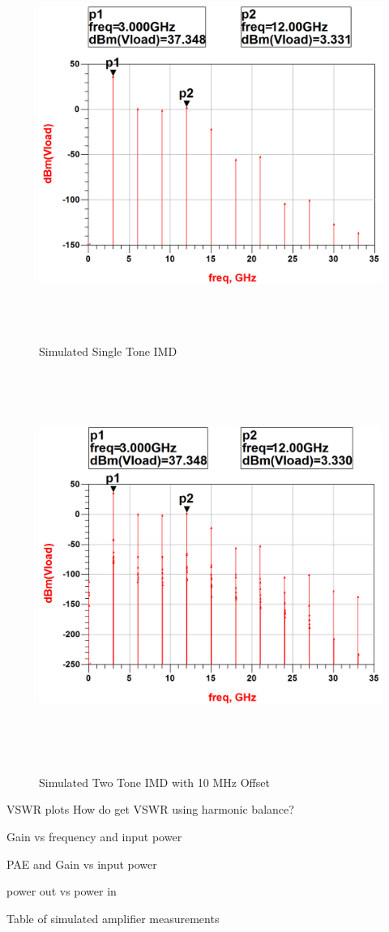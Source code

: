 \begin{figure}
  \centering
  \includegraphics[width=5in,height=5in,keepaspectratio]{figures/amp_sim/IMD_singletone}\\
  \caption{Simulated Single Tone IMD}
  \label{fig:imd_single}

  \vspace*{\floatsep}

  \centering
  \includegraphics[width=5in,height=5in,keepaspectratio]{figures/amp_sim/IMD_twotone}\\
  \caption{Simulated Two Tone IMD with 10 MHz Offset}
  \label{fig:imd_double}
\end{figure}

VSWR plots
How do get VSWR using harmonic balance?

Gain vs frequency and input power

PAE and Gain vs input power

power out vs power in

Table of simulated amplifier measurements

